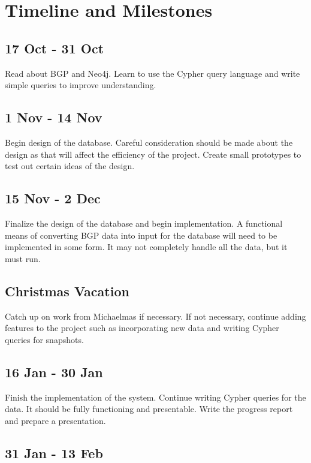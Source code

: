 \documentclass[12pt,a4paper,twoside]{article}
\begin{document}
\section*{Timeline and Milestones}

\subsection*{17 Oct - 31 Oct}

Read about BGP and Neo4j. Learn to use the Cypher query language and write simple queries to improve understanding. 

\subsection*{1 Nov - 14 Nov}

Begin design of the database. Careful consideration should be made about the design as that will affect the efficiency of the project. Create small prototypes to test out certain ideas of the design. 

\subsection*{15 Nov - 2 Dec}

Finalize the design of the database and begin implementation. A functional means of converting BGP data into input for the database will need to be implemented in some form. It may not completely handle all the data, but it must run. 

\subsection*{Christmas Vacation}

Catch up on work from Michaelmas if necessary. If not necessary, continue adding features to the project such as incorporating new data and writing Cypher queries for snapshots.

\subsection*{16 Jan - 30 Jan}

Finish the implementation of the system. Continue writing Cypher queries for the data. It should be fully functioning and presentable. Write the progress report and prepare a presentation.

\subsection*{31 Jan - 13 Feb}
\end{document}

